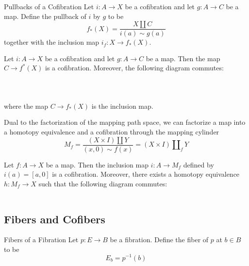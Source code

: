 \documentclass[a4paper]{article}
\begin{document}
\begin{defn}{Pullbacks of a Cofibration}{} Let $i:A\to X$ be a cofibration and let $g:A\to C$ be a map. Define the pullback of $i$ by $g$ to be $$f_\ast(X)=\frac{X\amalg C}{i(a)\sim g(a)}$$ together with the inclusion map $i_f:X\to f_\ast(X)$. 
\end{defn}

\begin{prp}{}{} Let $i:A\to X$ be a cofibration and let $g:A\to C$ be a map. Then the map $C\to f^\ast(X)$ is a cofibration. Moreover, the following diagram commutes: \\~\\
\\~\\
where the map $C\to f_\ast(X)$ is the inclusion map. 
\end{prp}

Dual to the factorization of the mapping path space, we can factorize a map into a homotopy equivalence and a cofibration through the mapping cylinder $$M_f=\frac{(X\times I)\amalg Y}{(x,0)\sim f(x)}=(X\times I)\amalg_fY$$

\begin{thm}{}{} Let $f:A\to X$ be a map. Then the inclusion map $i:A\to M_f$ defined by $i(a)=[a,0]$ is a cofibration. Moreover, there exists a homotopy equivalence $h:M_f\to X$ such that the following diagram commutes: \\~\\
\end{thm}

\subsection{Fibers and Cofibers}
\begin{defn}{Fibers of a Fibration}{} Let $p:E\to B$ be a fibration. Define the fiber of $p$ at $b\in B$ to be $$E_b=p^{-1}(b)$$
\end{defn}
\end{document}
